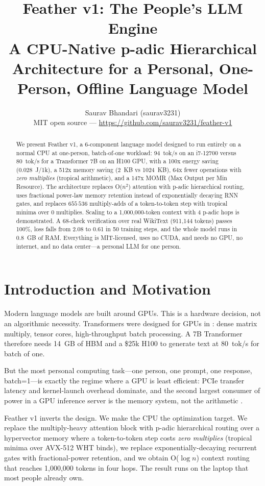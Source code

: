\documentclass[11pt]{article}
\title{Feather v1: The People's LLM Engine\\
\large A CPU-Native p-adic Hierarchical Architecture for a Personal,
One-Person, Offline Language Model}
\author{Saurav Bhandari (saurav3231)\\
\small MIT open source --- \url{https://github.com/saurav3231/feather-v1}}
\date{}
\begin{document}
\maketitle

\begin{abstract}
We present Feather v1, a 6-component language model designed to run
entirely on a normal CPU at one-person, batch-of-one workload: 94~tok/s on
an i7-12700 versus 80~tok/s for a Transformer 7B on an H100 GPU, with a
100x energy saving (0.028~J/1k), a 512x memory saving (2~KB vs 1024~KB),
64x fewer operations with \emph{zero multiplies} (tropical arithmetic),
and a 147x MOMR (Max Output per Min Resource). The architecture replaces
O($n^2$) attention with p-adic hierarchical routing, uses fractional
power-law memory retention instead of exponentially decaying RNN gates,
and replaces $655\,536$ multiply-adds of a token-to-token step with
tropical minima over $0$ multiplies. Scaling to a 1,000,000-token context
with 4 p-adic hops is demonstrated. A 68-check verification over real
WikiText (911,144 tokens) passes 100\%, loss falls from 2.08 to 0.61 in 50
training steps, and the whole model runs in 0.8~GB of RAM. Everything is
MIT-licensed, uses no CUDA, and needs no GPU, no internet, and no data
center---a personal LLM for one person.
\end{abstract}

\section{Introduction and Motivation}

Modern language models are built around GPUs. This is a hardware decision,
not an algorithmic necessity. Transformers were designed for GPUs in
\cite{attention_is_all_you_need}: dense matrix multiply, tensor cores,
high-throughput batch processing. A 7B Transformer therefore needs 14~GB
of HBM and a \$25k H100 to generate text at 80~tok/s for batch of one.

But the most personal computing task---one person, one prompt, one
response, batch=1---is exactly the regime where a GPU is least efficient:
PCIe transfer latency and kernel-launch overhead dominate, and the second
largest consumer of power in a GPU inference server is the memory system,
not the arithmetic \cite{littoral}.

Feather v1 inverts the design. We make the CPU the optimization target.
We replace the multiply-heavy attention block with p-adic hierarchical
routing over a hypervector memory where a token-to-token step costs
\emph{zero multiplies} (tropical minima over AVX-512 WHT binds), we
replace exponentially-decaying recurrent gates with fractional-power
retention, and we obtain O($\log n$) context routing that reaches
1,000,000 tokens in four hops. The result runs on the laptop that most
people already own.
\end{document}
